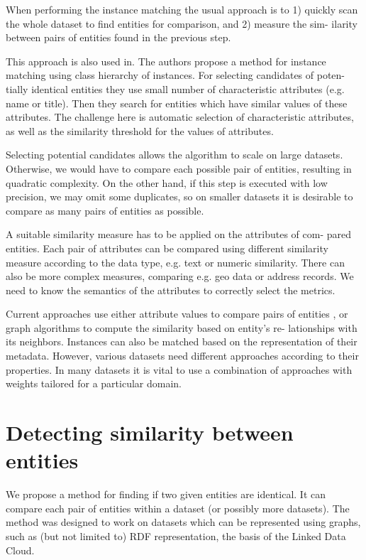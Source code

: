 \documentclass{llncs}
\begin{document}
When performing the instance matching the usual approach is to 1) quickly
scan the whole dataset to find entities for comparison, and 2) measure the sim-
ilarity between pairs of entities found in the previous step\cite{17,12}.

This approach is also used in\cite{1}. The authors propose a method for instance
matching using class hierarchy of instances. For selecting candidates of poten-
tially identical entities they use small number of characteristic attributes (e.g.
name or title). Then they search for entities which have similar values of these
attributes. The challenge here is automatic selection of characteristic attributes,
as well as the similarity threshold for the values of attributes.

Selecting potential candidates allows the algorithm to scale on large datasets.
Otherwise, we would have to compare each possible pair of entities, resulting
in quadratic complexity. On the other hand, if this step is executed with low
precision, we may omit some duplicates, so on smaller datasets it is desirable to
compare as many pairs of entities as possible.

A suitable similarity measure has to be applied on the attributes of com-
pared entities. Each pair of attributes can be compared using different similarity
measure according to the data type, e.g. text or numeric similarity. There can
also be more complex measures, comparing e.g. geo data or address records\cite{15}.
We need to know the semantics of the attributes to correctly select the metrics.

Current approaches use either attribute values to compare pairs of entities
\cite{13}, or graph algorithms to compute the similarity based on entity's re-
lationships with its neighbors\cite{11}. Instances can also be matched based on the
representation of their metadata\cite{14}. However, various datasets need different
approaches according to their properties. In many datasets it is vital to use a
combination of approaches with weights tailored for a particular domain.

\section{Detecting similarity between entities}

We propose a method for finding if two given entities are identical. It can compare
each pair of entities within a dataset (or possibly more datasets). The method
was designed to work on datasets which can be represented using graphs, such
as (but not limited to) RDF representation, the basis of the Linked Data Cloud.
\end{document}
